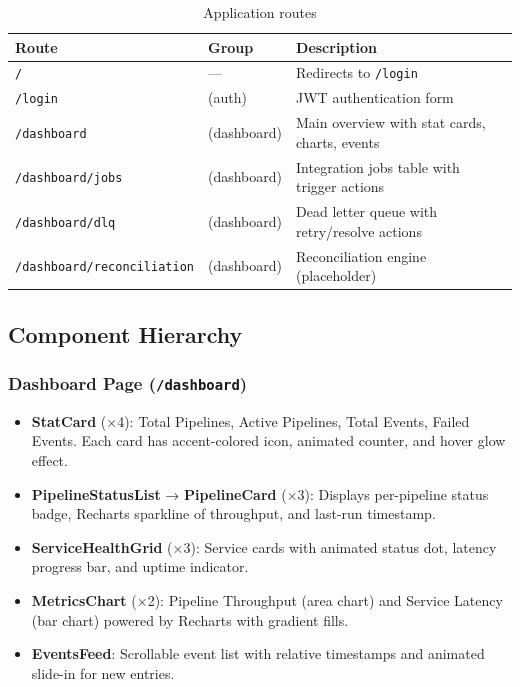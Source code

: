 \documentclass[12pt,a4paper]{article}
\begin{document}
\begin{table}[H]
\centering
\begin{tabularx}{\textwidth}{llX}
\toprule
\textbf{Route} & \textbf{Group} & \textbf{Description} \\
\midrule
\texttt{/}                         & ---        & Redirects to \texttt{/login} \\
\texttt{/login}                    & (auth)     & JWT authentication form \\
\texttt{/dashboard}                & (dashboard)& Main overview with stat cards, charts, events \\
\texttt{/dashboard/jobs}           & (dashboard)& Integration jobs table with trigger actions \\
\texttt{/dashboard/dlq}            & (dashboard)& Dead letter queue with retry/resolve actions \\
\texttt{/dashboard/reconciliation} & (dashboard)& Reconciliation engine (placeholder) \\
\bottomrule
\end{tabularx}
\caption{Application routes}
\end{table}

\subsection{Component Hierarchy}

\subsubsection{Dashboard Page (\texttt{/dashboard})}

\begin{itemize}[leftmargin=2em]
  \item \textbf{StatCard} (×4): Total Pipelines, Active Pipelines, Total Events, Failed Events. Each card has accent-colored icon, animated counter, and hover glow effect.
  \item \textbf{PipelineStatusList} → \textbf{PipelineCard} (×3): Displays per-pipeline status badge, Recharts sparkline of throughput, and last-run timestamp.
  \item \textbf{ServiceHealthGrid} (×3): Service cards with animated status dot, latency progress bar, and uptime indicator.
  \item \textbf{MetricsChart} (×2): Pipeline Throughput (area chart) and Service Latency (bar chart) powered by Recharts with gradient fills.
  \item \textbf{EventsFeed}: Scrollable event list with relative timestamps and animated slide-in for new entries.
\end{itemize}
\end{document}
